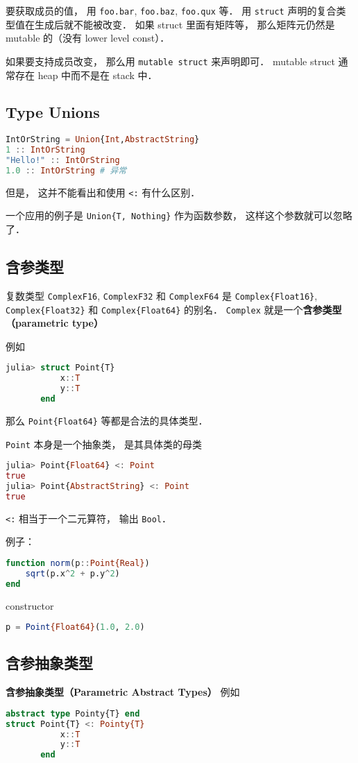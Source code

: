 要获取成员的值， 用 \verb|foo.bar|, \verb|foo.baz|, \verb|foo.qux| 等． 用 \verb|struct| 声明的复合类型值在生成后就不能被改变． 如果 struct 里面有矩阵等， 那么矩阵元仍然是 mutable 的（没有 lower level const）．

如果要支持成员改变， 那么用 \verb|mutable struct| 来声明即可． mutable struct 通常存在 heap 中而不是在 stack 中．

\subsection{Type Unions}
\begin{lstlisting}[language=julia]
IntOrString = Union{Int,AbstractString}
1 :: IntOrString
"Hello!" :: IntOrString
1.0 :: IntOrString # 异常
\end{lstlisting}
但是， 这并不能看出和使用 \verb|<:| 有什么区别．

一个应用的例子是 \verb|Union{T, Nothing}| 作为函数参数， 这样这个参数就可以忽略了．

\subsection{含参类型}

复数类型 \verb|ComplexF16|, \verb|ComplexF32| 和 \verb|ComplexF64| 是 \verb|Complex{Float16}|, \verb|Complex{Float32}| 和 \verb|Complex{Float64}| 的别名． \verb|Complex| 就是一个\textbf{含参类型（parametric type）}

例如
\begin{lstlisting}[language=julia]
julia> struct Point{T}
           x::T
           y::T
       end
\end{lstlisting}
那么 \verb|Point{Float64}| 等都是合法的具体类型．

\verb|Point| 本身是一个抽象类， 是其具体类的母类
\begin{lstlisting}[language=julia]
julia> Point{Float64} <: Point
true
julia> Point{AbstractString} <: Point
true
\end{lstlisting}
\verb|<:| 相当于一个二元算符， 输出 \verb|Bool|．

例子：
\begin{lstlisting}[language=julia]
function norm(p::Point{Real})
    sqrt(p.x^2 + p.y^2)
end
\end{lstlisting}
constructor
\begin{lstlisting}[language=julia]
p = Point{Float64}(1.0, 2.0)
\end{lstlisting}

\subsection{含参抽象类型}
\textbf{含参抽象类型（Parametric Abstract Types）}
例如
\begin{lstlisting}[language=julia]
abstract type Pointy{T} end
struct Point{T} <: Pointy{T}
           x::T
           y::T
       end
\end{lstlisting}

